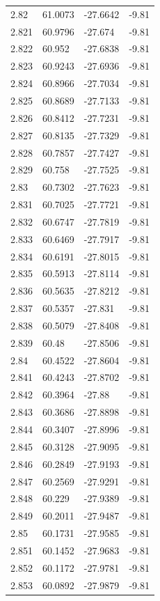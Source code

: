 \begin{tabular}{llll}
2.82 & 61.0073 & -27.6642 & -9.81 \\
2.821 & 60.9796 & -27.674 & -9.81 \\
2.822 & 60.952 & -27.6838 & -9.81 \\
2.823 & 60.9243 & -27.6936 & -9.81 \\
2.824 & 60.8966 & -27.7034 & -9.81 \\
2.825 & 60.8689 & -27.7133 & -9.81 \\
2.826 & 60.8412 & -27.7231 & -9.81 \\
2.827 & 60.8135 & -27.7329 & -9.81 \\
2.828 & 60.7857 & -27.7427 & -9.81 \\
2.829 & 60.758 & -27.7525 & -9.81 \\
2.83 & 60.7302 & -27.7623 & -9.81 \\
2.831 & 60.7025 & -27.7721 & -9.81 \\
2.832 & 60.6747 & -27.7819 & -9.81 \\
2.833 & 60.6469 & -27.7917 & -9.81 \\
2.834 & 60.6191 & -27.8015 & -9.81 \\
2.835 & 60.5913 & -27.8114 & -9.81 \\
2.836 & 60.5635 & -27.8212 & -9.81 \\
2.837 & 60.5357 & -27.831 & -9.81 \\
2.838 & 60.5079 & -27.8408 & -9.81 \\
2.839 & 60.48 & -27.8506 & -9.81 \\
2.84 & 60.4522 & -27.8604 & -9.81 \\
2.841 & 60.4243 & -27.8702 & -9.81 \\
2.842 & 60.3964 & -27.88 & -9.81 \\
2.843 & 60.3686 & -27.8898 & -9.81 \\
2.844 & 60.3407 & -27.8996 & -9.81 \\
2.845 & 60.3128 & -27.9095 & -9.81 \\
2.846 & 60.2849 & -27.9193 & -9.81 \\
2.847 & 60.2569 & -27.9291 & -9.81 \\
2.848 & 60.229 & -27.9389 & -9.81 \\
2.849 & 60.2011 & -27.9487 & -9.81 \\
2.85 & 60.1731 & -27.9585 & -9.81 \\
2.851 & 60.1452 & -27.9683 & -9.81 \\
2.852 & 60.1172 & -27.9781 & -9.81 \\
2.853 & 60.0892 & -27.9879 & -9.81 \\

\end{tabular}
